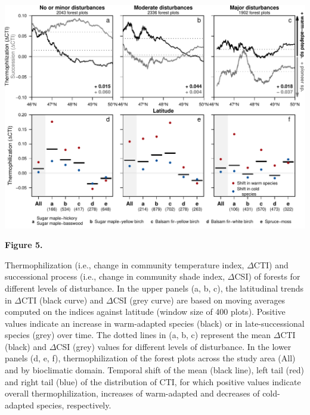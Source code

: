 \documentclass[a4paperpaper,]{article}
\begin{document}
\pagebreak

\includegraphics[width=6.6in,height=\textheight]{ms/figures/fig5_thermo.pdf}

\textbf{Figure 5.}

Thermophilization (i.e., change in community temperature index,
\(\Delta\)CTI) and successional process (i.e., change in community shade
index, \(\Delta\)CSI) of forests for different levels of disturbance. In
the upper panels (a, b, c), the latitudinal trends in \(\Delta\)CTI
(black curve) and \(\Delta\)CSI (grey curve) are based on moving
averages computed on the indices against latitude (window size of 400
plots). Positive values indicate an increase in warm-adapted species
(black) or in late-successional species (grey) over time. The dotted
lines in (a, b, c) represent the mean \(\Delta\)CTI (black) and
\(\Delta\)CSI (grey) values for different levels of disturbance. In the
lower panels (d, e, f), thermophilization of the forest plots across the
study area (All) and by bioclimatic domain. Temporal shift of the mean
(black line), left tail (red) and right tail (blue) of the distribution
of CTI, for which positive values indicate overall thermophilization,
increases of warm-adapted and decreases of cold-adapted species,
respectively.

\pagebreak
\end{document}
